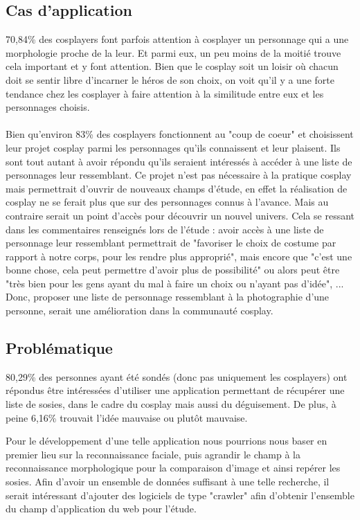 \documentclass[a4paper,12pt]{article}
\begin{document}
\subsection{Cas d'application}
70,84\% des cosplayers font parfois attention à cosplayer un personnage qui a une morphologie proche de la leur. Et parmi eux, un peu moins de la moitié trouve cela important et y font attention. Bien que le cosplay soit un loisir où chacun doit se sentir libre d'incarner le héros de son choix, on voit qu'il y a une forte tendance chez les cosplayer à faire attention à la similitude entre eux et les personnages choisis. 
\\ \\
Bien qu'environ 83\% des cosplayers fonctionnent au "coup de coeur" et choisissent leur projet cosplay parmi les personnages qu'ils connaissent et leur plaisent. Ils sont tout autant à avoir répondu qu'ils seraient intéressés à accéder à une liste de personnages leur ressemblant. Ce projet n'est pas nécessaire à la pratique cosplay mais permettrait d'ouvrir de nouveaux champs d'étude, en effet la réalisation de cosplay ne se ferait plus que sur des personnages connus à l'avance. Mais au contraire serait un point d'accès pour découvrir un nouvel univers. Cela se ressant dans les commentaires renseignés lors de l'étude : avoir accès à une liste de personnage leur ressemblant permettrait de "favoriser le choix de costume par rapport à notre corps, pour les rendre plus approprié", mais encore que "c'est une bonne chose, cela peut permettre d'avoir plus de possibilité" ou alors peut être "très bien pour les gens ayant du mal à faire un choix ou n'ayant pas d'idée", ... Donc, proposer une liste de personnage ressemblant à la photographie d'une personne, serait une amélioration dans la communauté cosplay.  

\subsection{Problématique}
80,29\% des personnes ayant été sondés (donc pas uniquement les cosplayers) ont répondus être intéressées d'utiliser une application permettant de récupérer une liste de sosies, dans le cadre du cosplay mais aussi du déguisement. De plus, à peine 6,16\% trouvait l'idée mauvaise ou plutôt mauvaise. 

Pour le développement d'une telle application nous pourrions nous baser en premier lieu sur la reconnaissance faciale, puis agrandir le champ à la reconnaissance morphologique pour la comparaison d'image et ainsi repérer les sosies. 
Afin d'avoir un ensemble de données suffisant à une telle recherche, il serait intéressant d'ajouter des logiciels de type "crawler" afin d'obtenir l'ensemble du champ d'application du web pour l'étude. 
\end{document}
